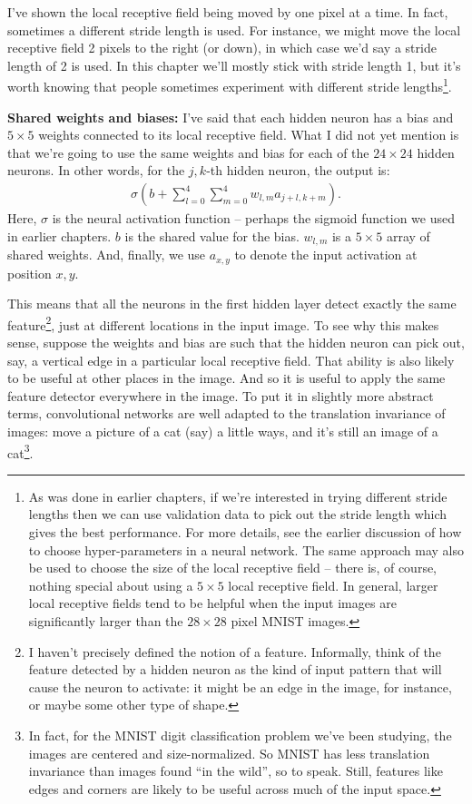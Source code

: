 \documentclass[a4paper,twoside,10pt]{book}
\begin{document}
I've shown the local receptive field being moved by one pixel at a time. In fact, sometimes a different stride length is used. For instance, we might move the local receptive field 2 pixels to the right (or down), in which case we'd say a stride length of 2 is used. In this chapter we'll mostly stick with stride length 1, but it's worth knowing that people sometimes experiment with different stride lengths\footnote{As was done in earlier chapters, if we're interested in trying different stride lengths then we can use validation data to pick out the stride length which gives the best performance. For more details, see the earlier discussion of how to choose hyper-parameters in a neural network. The same approach may also be used to choose the size of the local receptive field -- there is, of course, nothing special about using a $5\times5$ local receptive field. In general, larger local receptive fields tend to be helpful when the input images are significantly larger than the $28\times28$ pixel MNIST images.}.

\textbf{Shared weights and biases:} I've said that each hidden neuron has a bias and $5\times5$ weights connected to its local receptive field. What I did not yet mention is that we're going to use the same weights and bias for each of the $24\times24$ hidden neurons. In other words, for the $j,k$-th hidden neuron, the output is:
\begin{align} 
\sigma\left(b + \sum_{l=0}^4 \sum_{m=0}^4  w_{l,m} a_{j+l, k+m} \right).\tag{125}\label{eq:125}
\end{align}
Here, $\sigma$ is the neural activation function -- perhaps the sigmoid function we used in earlier chapters. $b$ is the shared value for the bias. $w_{l,m}$ is a $5\times5$ array of shared weights. And, finally, we use $a_{x,y}$ to denote the input activation at position $x,y$.

This means that all the neurons in the first hidden layer detect exactly the same feature\footnote{I haven't precisely defined the notion of a feature. Informally, think of the feature detected by a hidden neuron as the kind of input pattern that will cause the neuron to activate: it might be an edge in the image, for instance, or maybe some other type of shape.}, just at different locations in the input image. To see why this makes sense, suppose the weights and bias are such that the hidden neuron can pick out, say, a vertical edge in a particular local receptive field. That ability is also likely to be useful at other places in the image. And so it is useful to apply the same feature detector everywhere in the image. To put it in slightly more abstract terms, convolutional networks are well adapted to the translation invariance of images: move a picture of a cat (say) a little ways, and it's still an image of a cat\footnote{In fact, for the MNIST digit classification problem we've been studying, the images are centered and size-normalized. So MNIST has less translation invariance than images found ``in the wild'', so to speak. Still, features like edges and corners are likely to be useful across much of the input space.}.
\end{document}
